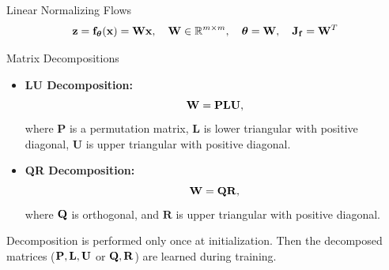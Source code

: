 \documentclass{beamer}
\begin{document}
\begin{frame}{Linear Normalizing Flows}
	\vspace{-0.3cm}
	\[
		\mathbf{z} = \mathbf{f}_{\boldsymbol{\theta}}(\mathbf{x}) = \mathbf{W} \mathbf{x}, \quad \mathbf{W} \in \mathbb{R}^{m \times m}, \quad \boldsymbol{\theta} = \mathbf{W}, \quad \mathbf{J}_{\mathbf{f}} = \mathbf{W}^T
	\]
	\vspace{-0.7cm}
	\begin{block}{Matrix Decompositions}
		\begin{itemize}
			\item \textbf{LU Decomposition:}
			\vspace{-0.3cm}
			\[
				\mathbf{W} = \mathbf{P} \mathbf{L} \mathbf{U},
			\]
			where $\mathbf{P}$ is a permutation matrix, $\mathbf{L}$ is lower triangular with positive diagonal, $\mathbf{U}$ is upper triangular with positive diagonal.
			\item \textbf{QR Decomposition:}
			\vspace{-0.3cm}
			\[
				\mathbf{W} = \mathbf{Q} \mathbf{R},
			\]
			where $\mathbf{Q}$ is orthogonal, and $\mathbf{R}$ is upper triangular with positive diagonal.
		\end{itemize}
	\end{block}

	Decomposition is performed only once at initialization. Then the decomposed matrices ($\mathbf{P}, \mathbf{L}, \mathbf{U}$ or $\mathbf{Q}, \mathbf{R}$) are learned during training.

\end{frame}
\end{document}
